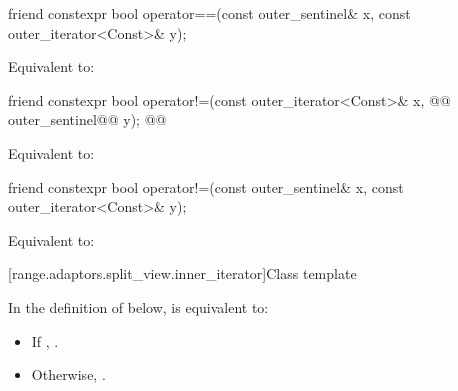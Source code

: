 {\color{oldclr}
%
\begin{itemdecl}
friend constexpr bool operator==(const outer_sentinel& x, const outer_iterator<Const>& y);
\end{itemdecl}

\begin{itemdescr}
\pnum
\effects Equivalent to: 
\end{itemdescr}
} %

%
\begin{itemdecl}
friend constexpr bool operator!=(const outer_iterator<Const>& x, @@ outer_sentinel@\oldtxt{\&}@ y);
@@
\end{itemdecl}

\begin{itemdescr}
\pnum
\effects Equivalent to: 
\end{itemdescr}

{\color{oldclr}
%
\begin{itemdecl}
friend constexpr bool operator!=(const outer_sentinel& x, const outer_iterator<Const>& y);
\end{itemdecl}

\begin{itemdescr}
\pnum
\effects Equivalent to: 
\end{itemdescr}
} %

[range.adaptors.split_view.inner_iterator]{Class template }

\pnum
\begin{note}
\end{note}

{\color{oldclr}
\pnum
In the definition of  below,
 is equivalent to:
\begin{itemize}
\item If    , .

\item Otherwise, .
\end{itemize}
} %

